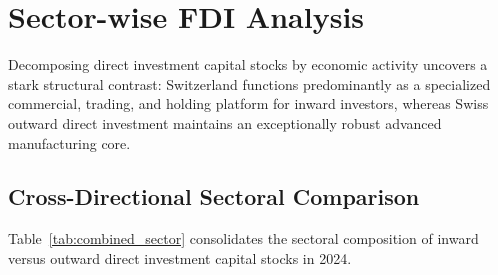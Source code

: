 
\section{Sector-wise FDI Analysis}

Decomposing direct investment capital stocks by economic activity uncovers a stark structural contrast: Switzerland functions predominantly as a specialized commercial, trading, and holding platform for inward investors, whereas Swiss outward direct investment maintains an exceptionally robust advanced manufacturing core.

\subsection{Cross-Directional Sectoral Comparison}

Table~\ref{tab:combined_sector} consolidates the sectoral composition of inward versus outward direct investment capital stocks in 2024.

